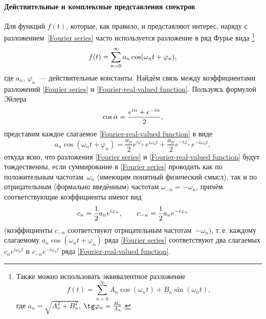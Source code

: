 \paragraph{Действительные и комплексные представления спектров}
Для  функций $f(t)$, которые, как правило, 
и представляют интерес, наряду с разложением~\eqref{Fourier series} 
часто используется разложение в ряд Фурье вида%
\footnote{Также можно использовать эквивалентное разложение
\[
f(t)=\sum\limits_{n=0}^{\infty} A_n \cos(\omega_n t) + B_n \sin(\omega_n t),
\]
где $a_n=\sqrt{A_n^2+B_n^2}$, $\tg \varphi_n = \frac{B_n}{A_n}$.}
\begin{equation}
    \eqmark{Fourier-real-valued function}
    f(t)=\sum\limits_{n=0}^{\infty} a_n \cos(\omega_n t+\varphi_n ),
\end{equation}
где $a_n$, $\varphi_n$~--- действительные константы. Найдём связь между
коэффициентами разложений \eqref{Fourier series} и \eqref{Fourier-real-valued function}.
Пользуясь формулой Эйлера
\begin{equation}
    \eqmark{euler}
    \cos\alpha=\frac{e^{i\alpha}+e^{-i\alpha}}{2},
\end{equation}
представим каждое слагаемое \eqref{Fourier-real-valued function} в виде
\begin{equation*}
    a_n\cos(\omega_nt+\varphi_n)=\frac{a_n}{2}e^{i\varphi_n}\,e^{i\omega_n
t}+\frac{a_n}{2}e^{-i\varphi_n}\,e^{-i\omega_n t},
\end{equation*}
откуда ясно, что разложения \eqref{Fourier series} и
\eqref{Fourier-real-valued function} будут тождественны, если суммирование в
\eqref{Fourier series} проводить как по положительным частотам~$\omega_n$
(имеющим понятный физический смысл), так и по отрицательным (формально введённым)
частотам $\omega_{-n}=-\omega_n$, причём соответствующие коэффициенты имеют вид
\begin{equation}
    \eqmark{Fourier-coefficient}
    c_n =\frac{1}{2}a_n e^{i\varphi_n},
    \qquad c_{-n}=\frac{1}{2}a_n e^{-i\varphi_n}
\end{equation}
(коэффициенты $c_{-n}$ соответствуют отрицательным частотам~$-\omega_n)$,
т.\,е. каждому слагаемому $a_n\cos(\omega_nt+\varphi_n)$ ряда \eqref{Fourier series}
соответствуют два слагаемых $c_ne^{i\omega_n t}$ и
$c_{-n}e^{-i\omega_n t}$ ряда \eqref{Fourier-real-valued function}.


